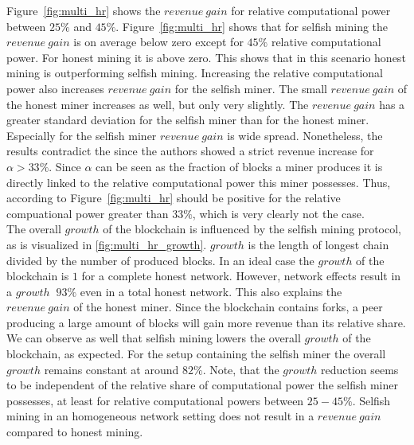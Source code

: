 Figure~\ref{fig:multi_hr} shows the $revenue~gain$ for relative computational power between $25\% $ and $45\% $. Figure~\ref{fig:multi_hr} shows that for selfish mining the $revenue~gain$ is on average below zero except for $45\% $ relative computational power. For honest mining it is above zero. This shows that in this scenario honest mining is outperforming selfish mining. Increasing the relative computational power also increases $revenue~gain$ for the selfish miner. The small $revenue~gain$ of the honest miner increases as well, but only very slightly. The $revenue~gain$ has a greater standard deviation for the selfish miner than for the honest miner. Especially for the selfish miner $revenue~gain$ is wide spread. Nonetheless, the results contradict the  since the authors showed a strict revenue increase for $\alpha > 33\% $. Since $\alpha$ can be seen as the fraction of blocks a miner produces it is directly linked to the relative computational power this miner possesses. Thus, according to  Figure~\ref{fig:multi_hr} should be positive for the relative compuational power greater than $33\% $, which is very clearly not the case.\\
The overall $growth$ of the blockchain is influenced by the selfish mining protocol, as is visualized in \ref{fig:multi_hr_growth}. $growth$ is the length of longest chain divided by the number of produced blocks. In an ideal case the $growth$ of the blockchain is $1$ for a complete honest network. However, network effects result in a $growth$ $~93\% $ even in a total honest network. This also explains the $revenue~gain$ of the honest miner. Since the blockchain contains forks, a peer producing a large amount of blocks will gain more revenue than its relative share. We can observe as well that selfish mining lowers the overall $growth$ of the blockchain, as expected. For the setup containing the selfish miner the overall $growth$ remains constant at around $82\% $. Note, that the $growth$ reduction seems to be independent of the relative share of computational power the selfish miner possesses, at least for relative computational powers between $25-45\% $.
Selfish mining in an homogeneous network setting does not result in a $revenue~gain$ compared to honest mining.

